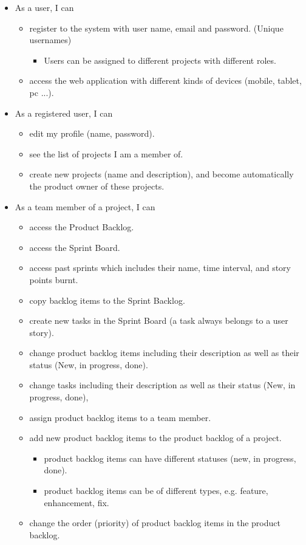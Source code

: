 \documentclass[
	accentcolor=tud1a %
]{tudreport}
\begin{document}
\begin{itemize}
	\item As a user, I can
	\begin{itemize}
		\item register to the system with user name, email and password. (Unique usernames)
		\begin{itemize}
			\item Users can be assigned to different projects with different roles.
		\end{itemize}
		\item access the web application with different kinds of devices (mobile, tablet, pc ...).
	\end{itemize}
	
	\item As a registered user, I can
	\begin{itemize}
		\item edit my profile (name, password).
		\item see the list of projects I am a member of.
		\item create new projects (name and description), and become automatically the product owner of these projects.
	\end{itemize}

	\item  As a team member of a project, I can
	\begin{itemize}
		\item access the Product Backlog.
		\item access the Sprint Board.
		\item access past sprints which includes their name, time interval, and story points burnt.
		\item copy backlog items to the Sprint Backlog.
		\item create new tasks in the Sprint Board (a task always belongs to a user story).
		\item change product backlog items including their description as well as their status (New, in progress, done).
		\item change tasks including their description as well as their status (New, in progress, done),
		\item assign product backlog items to a team member.
		\item add new product backlog items to the product backlog of a project.
		\begin{itemize}
			\item product backlog items can have different statuses (new, in progress, done).
			\item product backlog items can be of different types, e.g. feature, enhancement, fix.
		\end{itemize}
		\item change the order (priority) of product backlog items in the product backlog.
	\end{itemize}
	

\end{itemize}
\end{document}
